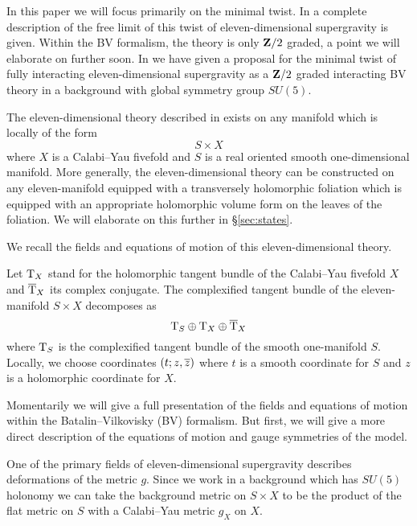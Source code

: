 In this paper we will focus primarily on the minimal twist. 
In \cite{SWspinor} a complete description of the free limit of this twist of eleven-dimensional supergravity is given.
Within the BV formalism, the theory is only $\mathbf{Z}/2$ graded, a point we will elaborate on further soon. 
In \cite{RSW} we have given a proposal for the minimal twist of fully interacting eleven-dimensional supergravity as a $\mathbf{Z}/2$ graded interacting BV theory in a background with global symmetry group $SU(5)$.

The eleven-dimensional theory described in \cite{RSW} exists on any manifold which is locally of the form 
\[
S \times X 
\] 
where $X$ is a Calabi--Yau fivefold and $S$ is a real oriented smooth one-dimensional manifold.
More generally, the eleven-dimensional theory can be constructed on any eleven-manifold equipped with a transversely holomorphic foliation which is equipped with an appropriate holomorphic volume form on the leaves of the foliation.
We will elaborate on this further in \S \ref{sec:states}.

We recall the fields and equations of motion of this eleven-dimensional theory. 

%

\parsec[s:sugrafields]

Let ${\rm T}_X$ stand for the holomorphic tangent bundle of the Calabi--Yau fivefold $X$ and $\overline{{\rm T}}_X$ its complex conjugate.
The complexified tangent bundle of the eleven-manifold $S \times X$ decomposes as
\[
{\rm T}_S \oplus {\rm T}_X \oplus \overline{{\rm T}}_X 
\]
where ${\rm T}_S$ is the complexified tangent bundle of the smooth one-manifold $S$.
Locally, we choose coordinates $(t;z,\overline{z})$ where $t$ is a smooth coordinate for $S$ and $z$ is a holomorphic coordinate for $X$. 

Momentarily we will give a full presentation of the fields and equations of motion within the Batalin--Vilkovisky (BV) formalism.
But first, we will give a more direct description of the equations of motion and gauge symmetries of the model.
 
One of the primary fields of eleven-dimensional supergravity describes deformations of the metric $g$.
Since we work in a background which has $SU(5)$ holonomy we can take the background metric on $S \times X$ to be the product of the flat metric on $S$ with a Calabi--Yau metric $g_{X}$ on $X$. 


